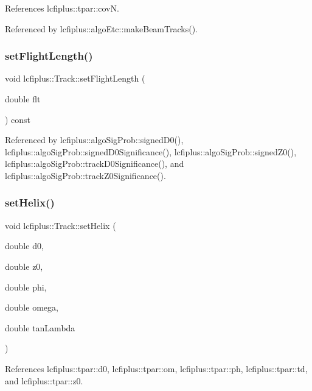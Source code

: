 References lcfiplus\+::tpar\+::covN.



Referenced by lcfiplus\+::algo\+Etc\+::make\+Beam\+Tracks().

\mbox{\label{classlcfiplus_1_1Track_ab4e72856f0c199f4a8bb83630a005d97}} 
\subsubsection{set\+Flight\+Length()}
{\footnotesize\ttfamily void lcfiplus\+::\+Track\+::set\+Flight\+Length (\begin{DoxyParamCaption}\item[{double}]{flt }\end{DoxyParamCaption}) const\hspace{0.3cm}{\ttfamily [inline]}}



Referenced by lcfiplus\+::algo\+Sig\+Prob\+::signed\+D0(), lcfiplus\+::algo\+Sig\+Prob\+::signed\+D0\+Significance(), lcfiplus\+::algo\+Sig\+Prob\+::signed\+Z0(), lcfiplus\+::algo\+Sig\+Prob\+::track\+D0\+Significance(), and lcfiplus\+::algo\+Sig\+Prob\+::track\+Z0\+Significance().

\mbox{\label{classlcfiplus_1_1Track_a452db77ca4bb44524d5123673851b27f}} 
\subsubsection{set\+Helix()\hspace{0.1cm}{\footnotesize\ttfamily [1/2]}}
{\footnotesize\ttfamily void lcfiplus\+::\+Track\+::set\+Helix (\begin{DoxyParamCaption}\item[{double}]{d0,  }\item[{double}]{z0,  }\item[{double}]{phi,  }\item[{double}]{omega,  }\item[{double}]{tan\+Lambda }\end{DoxyParamCaption})\hspace{0.3cm}{\ttfamily [inline]}}



References lcfiplus\+::tpar\+::d0, lcfiplus\+::tpar\+::om, lcfiplus\+::tpar\+::ph, lcfiplus\+::tpar\+::td, and lcfiplus\+::tpar\+::z0.



